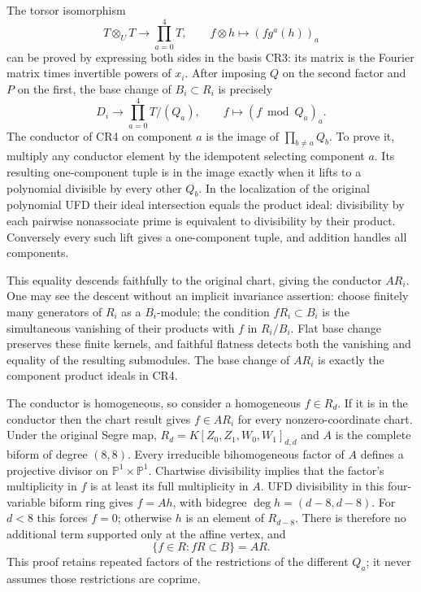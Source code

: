 \documentclass[11pt]{article}
\begin{document}
The torsor isomorphism
\[
 T\otimes_U T\longrightarrow\prod_{a=0}^4T,
 \qquad f\otimes h\longmapsto(fg^a(h))_a
\]
can be proved by expressing both sides in the basis CR3: its
matrix is the Fourier matrix times invertible powers of $x_i$.
After imposing $Q$ on the second factor and $P$ on the first,
the base change of $B_i\subset R_i$ is precisely
\[
 D_i\longrightarrow\prod_{a=0}^4T/(Q_a),
 \qquad f\longmapsto(f\bmod Q_a)_a.                            \tag{CR4}
\]
The conductor of CR4 on component $a$ is the image of
$\prod_{b\ne a}Q_b$.  To prove it, multiply any conductor element
by the idempotent selecting component $a$.  Its resulting one-component
tuple is in the image exactly when it lifts to a polynomial divisible
by every other $Q_b$.  In the localization of the original polynomial
UFD their ideal intersection equals the product ideal: divisibility
by each pairwise nonassociate prime is equivalent to divisibility by
their product.  Conversely every such lift gives a one-component
tuple, and addition handles all components.

This equality descends faithfully to the original chart, giving
the conductor $AR_i$.  One may see the descent without an implicit
invariance assertion: choose finitely many generators of $R_i$ as
a $B_i$-module; the condition $fR_i\subset B_i$ is the simultaneous
vanishing of their products with $f$ in $R_i/B_i$.  Flat base change
preserves these finite kernels, and faithful flatness detects both
the vanishing and equality of the resulting submodules.  The base
change of $AR_i$ is exactly the component product ideals in CR4.

The conductor is homogeneous, so consider a homogeneous $f\in R_d$.
If it is in the conductor then the chart result gives $f\in AR_i$
for every nonzero-coordinate chart.  Under the original Segre map,
$R_d=K[Z_0,Z_1,W_0,W_1]_{d,d}$ and $A$ is the complete biform of
degree $(8,8)$.  Every irreducible bihomogeneous factor of $A$
defines a projective divisor on $\mathbb P^1\times\mathbb P^1$.
Chartwise divisibility implies that the factor's multiplicity in
$f$ is at least its full multiplicity in $A$.  UFD divisibility
in this four-variable biform ring gives $f=Ah$, with bidegree
$\deg h=(d-8,d-8)$.  For $d<8$ this forces $f=0$; otherwise $h$
is an element of $R_{d-8}$.  There is therefore no additional
term supported only at the affine vertex, and
\[
 \boxed{\{f\in R:fR\subset B\}=AR.}                            \tag{CR5}
\]
This proof retains repeated factors of the restrictions of the
different $Q_a$; it never assumes those restrictions are coprime.
\end{document}
